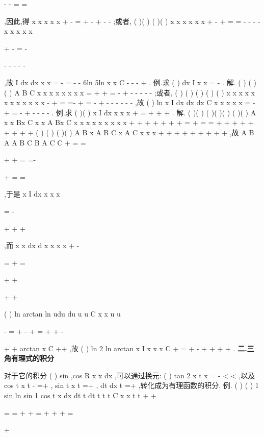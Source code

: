 \Rightarrow 


-
-
=
=


,因此,得 
x
x
x
x
x
+
-
=
+
-
+
-
-
;或者, (
)(
)
(
)(
)
x
x
x
x
x
x
+
-
+
=
=
-
-
-
-
x
x
x
x
x


+
-
=
-


-
-
-
-
-


,故
I
dx
dx
x
x
=
-
=
-
-
\int 
\int 
6ln
5ln
x
x
C
-
-
-
+
. 
\textcolor{lyred}{例}.求
(
)
dx
I
x x
=
-
\int 
. 
解.
(
)
(
)
(
)
A
B
C
x
x
x
x
x x
x
x
=
+
+
=
-
+
-
-
-
-
-
;或者, 
(
)
(
)
(
)
(
)
(
)
x
x
x x
x
x
x x
x x
x
x
-
+
=
=-
+
=
-
+
-
-
-
-
-
-
,故 
(
)
ln
x
I
dx
dx
dx
C
x
x
x
x
x
=
-
+
=
-
+
-
-
-
-
\int 
\int 
\int 
. 
\textcolor{lyred}{例}.求
(
)(
)
x
I
dx
x
x
x
+
=
+
+
+
\int 
. 
解.
(
)(
)
(
)(
)(
)
(
)(
)
A x
x
Bx
C
x
x
A
Bx
C
x
x
x
x
x
x
x
x
x
+
+
+
+
+
+
+
=
+
=
=
+
+
+
+
+
+
+
+
+
(
)
(
)
(
)(
)
A
B x
A
B
C x
A
C
x
x
x
+
+
+
+
+
+
+
+
+
,故
A
B
A
A
B
C
B
A
C
C
+
=
=




+
+
=\Rightarrow 
=-




+
=
=


,于是 
x
I
dx
x
x
x


=
-


+
+
+


\int 
,而
x
x
dx
d x
x
x
x
+
-


=
+
=


+
+




+
+




\int 
\int 
(
)
ln
arctan
ln
udu
du
u
u
C
x
x
u
u


-
=
+
-
\cdots 
+
=
+
+
-




+
+
\int 
\int 
arctan
x
C
++
,故
(
)
ln 2
ln
arctan
x
I
x
x
x
C
+
=
+
-
+
+
+
+
. 
\vspace{4pt}
{\bfseries \textcolor{lyred}{二.三角有理式的积分}}

对于它的积分
(
)
sin ,cos
R
x
x dx
\int 
,可以通过换元:
(
)
tan 2
x
t
x
\pi 
\pi 
=
-
<
<
,以及 
cos
t
x
t
-
=+
,
sin
t
x
t
=+
,
dt
dx
t
=+
,转化成为有理函数的积分.\textcolor{lyred}{ }
\textcolor{lyred}{例}.
(
)
(
)
1 sin
ln
sin
1 cos
t
x
dx
dt
t dt
t
t
t
C
x
x
t
t
+
+




=
=
+
+
=
+
+
+
=




+




